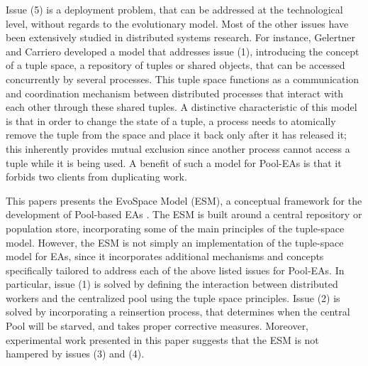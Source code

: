 Issue (5) is a deployment problem, that can be addressed at the technological level, without regards to the evolutionary model.
Most of the other issues have been extensively studied in distributed systems research.
For instance, Gelertner and Carriero \cite{linda} developed a model that addresses issue (1), introducing the concept of a tuple space, a repository of tuples or shared objects, that can be accessed concurrently by several processes. This tuple space functions as a communication and coordination mechanism between distributed processes that interact with each other through these shared tuples. A distinctive characteristic of this model is that in order to change the state of a tuple, a process needs to atomically remove the tuple from the space and place it back only after it has released it; this inherently provides mutual exclusion since another process cannot access a tuple while it is being used. A benefit of such a model for Pool-EAs is that it forbids two clients from duplicating work. 

This papers presents the EvoSpace Model (ESM), a conceptual framework for the development of Pool-based EAs \cite{Evospace}.
The ESM is built around a central repository or population store, incorporating some of the main principles of the tuple-space model.
However, the ESM is not simply an implementation of the tuple-space model for EAs,
since it incorporates additional mechanisms and concepts specifically tailored to address each of the above listed issues for Pool-EAs.
In particular, issue (1) is solved by defining the interaction between distributed workers and the centralized pool using the tuple space principles.
Issue (2) is solved by incorporating a reinsertion process, that determines when the central Pool will be starved, and takes proper corrective measures.
Moreover, experimental work presented in this paper suggests that the ESM is not hampered by issues (3) and (4).


